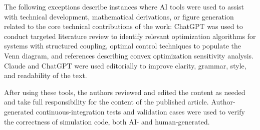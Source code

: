 \documentclass[a4paper,fleqn,colorlinks]{cas-dc}
\begin{document}
The following exceptions describe instances where AI tools were used to assist with technical development, mathematical derivations, or figure generation related to the core technical contributions of the work:
ChatGPT was used to conduct targeted literature review to identify relevant optimization algorithms for systems with structured coupling, optimal control techniques to populate the Venn diagram, and references describing convex optimization sensitivity analysis.
Claude and ChatGPT were used editorially to improve clarity, grammar, style, and readability of the text.

After using these tools, the authors reviewed and edited the content as needed and take full responsibility for the content of the published article.
Author-generated continuous-integration tests and validation cases were used to verify the correctness of simulation code, both AI- and human-generated.

\appendix
\singleColMacro{
    \clearpage
    
}
\printcredits




\end{document}
